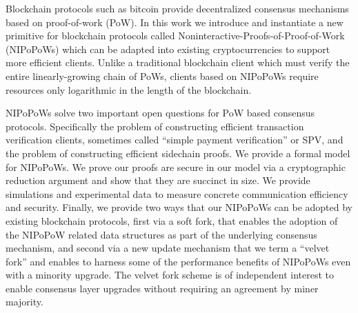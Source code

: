 Blockchain protocols such as bitcoin provide decentralized consensus
mechanisms based on proof-of-work (PoW).
%
In this work we introduce and instantiate a new primitive for blockchain protocols called Noninteractive-Proofs-of-Proof-of-Work (NIPoPoWs) which can be adapted into existing cryptocurrencies to support more efficient clients.
Unlike a traditional blockchain client which must verify the entire
linearly-growing chain of PoWs, clients based on NIPoPoWs require resources
only logarithmic in the length of the blockchain.

NIPoPoWs solve two important open questions for PoW based consensus
protocols. Specifically the problem
of constructing efficient transaction verification clients, sometimes called
``simple payment verification'' or SPV, and the problem of constructing
efficient sidechain proofs.
%
%
We provide a formal model for NIPoPoWs. We prove our proofs are secure in our
model via a cryptographic reduction argument and show that they are succinct in size. We provide
simulations and experimental data to measure concrete communication efficiency
and security.
Finally, we provide two ways that our NIPoPoWs can be adopted by
existing blockchain protocols, first via a soft fork, that enables the
adoption of the NIPoPoW related data structures
as part of the underlying consensus mechanism,
and second via a new update mechanism
that we term a ``velvet fork'' and enables to harness some of
the performance benefits of NIPoPoWs even with a minority upgrade. The
velvet fork scheme is of independent interest to enable consensus layer
upgrades without requiring an agreement by miner majority.

